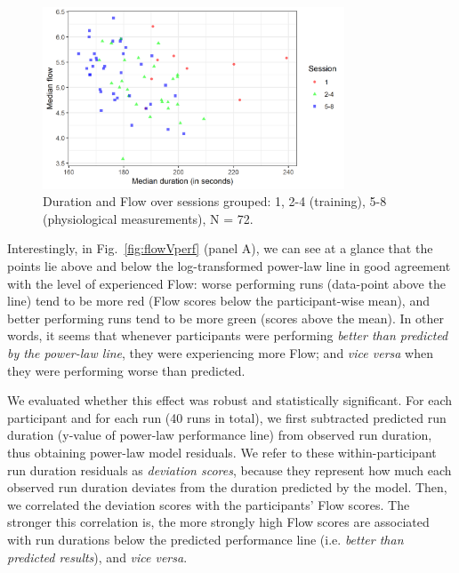 \documentclass[fleqn,10pt]{wlscirep}
\newcommand{\nicewidth}{0.8\textwidth}
\begin{document}
\begin{figure}[!ht]
  \centering
  \includegraphics[width=\nicewidth]{session_flowDuration_v3}
  \caption{Duration and Flow over sessions grouped: 1, 2-4 (training), 5-8 (physiological measurements), N = 72.}
  \label{fig:FlowVdurXssn}
\end{figure}

Interestingly, in Fig.~\ref{fig:flowVperf} (panel A), we can see at a glance that the points lie above and below the log-transformed power-law line in good agreement with the level of experienced Flow: worse performing runs (data-point above the line) tend to be more red (Flow scores below the participant-wise mean), and better performing runs tend to be more green (scores above the mean). In other words, it seems that whenever participants were performing {\it better than predicted by the power-law line}, they were experiencing more Flow; and {\it vice versa} when they were performing worse than predicted.

We evaluated whether this effect was robust and statistically significant. For each participant and for each run (40 runs in total), we first subtracted predicted run duration (y-value of power-law performance line) from observed run duration, thus obtaining power-law model residuals. We refer to these within-participant run duration residuals as {\it deviation scores}, because they represent how much each observed run duration deviates from the duration predicted by the model. Then, we correlated the deviation scores with the participants' Flow scores. The stronger this correlation is, the more strongly high Flow scores are associated with run durations below the predicted performance line (i.e. {\it better than predicted results}), and {\it vice versa}.
\end{document}
